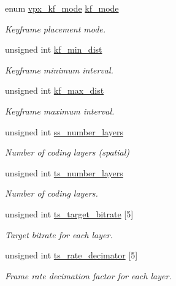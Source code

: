 \begin{DoxyCompactItemize}
enum \hyperlink{group__encoder_ga9f461802aa4db35c04a8b23837987f40}{vpx\+\_\+kf\+\_\+mode} \hyperlink{structvpx__codec__enc__cfg_a491d67f061dcdb13f60c017563e9d788}{kf\+\_\+mode}
\begin{DoxyCompactList}\small\item\em Keyframe placement mode. \end{DoxyCompactList}\item 
unsigned int \hyperlink{structvpx__codec__enc__cfg_a0a7b5444ecb09745cbe8d5af17553846}{kf\+\_\+min\+\_\+dist}
\begin{DoxyCompactList}\small\item\em Keyframe minimum interval. \end{DoxyCompactList}\item 
unsigned int \hyperlink{structvpx__codec__enc__cfg_ae018440136e271743376730413d25a9b}{kf\+\_\+max\+\_\+dist}
\begin{DoxyCompactList}\small\item\em Keyframe maximum interval. \end{DoxyCompactList}\item 
unsigned int \hyperlink{structvpx__codec__enc__cfg_a1e5e1d00b22f2ba8c5c7230f31900f95}{ss\+\_\+number\+\_\+layers}
\begin{DoxyCompactList}\small\item\em Number of coding layers (spatial) \end{DoxyCompactList}\item 
unsigned int \hyperlink{structvpx__codec__enc__cfg_a16d4549a30cbd585e3c3056ef873d8c7}{ts\+\_\+number\+\_\+layers}
\begin{DoxyCompactList}\small\item\em Number of coding layers. \end{DoxyCompactList}\item 
unsigned int \hyperlink{structvpx__codec__enc__cfg_aba7ceb7a90500a8f76aff89575737f3a}{ts\+\_\+target\+\_\+bitrate} \mbox{[}5\mbox{]}
\begin{DoxyCompactList}\small\item\em Target bitrate for each layer. \end{DoxyCompactList}\item 
unsigned int \hyperlink{structvpx__codec__enc__cfg_ad40c30846ef8ef1d8684f10a491ec535}{ts\+\_\+rate\+\_\+decimator} \mbox{[}5\mbox{]}
\begin{DoxyCompactList}\small\item\em Frame rate decimation factor for each layer. \end{DoxyCompactList}\item 

\end{DoxyCompactItemize}
